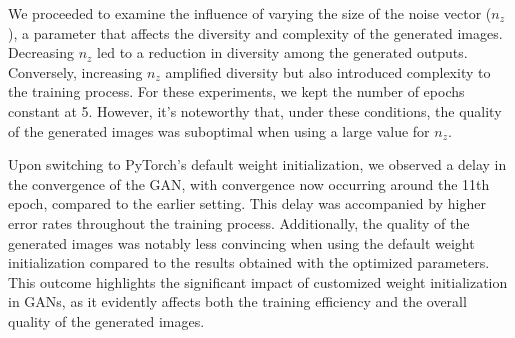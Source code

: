 We proceeded to examine the influence of varying the size of the noise vector ($n_z$), a parameter that affects the diversity and complexity of the generated images. Decreasing $n_z$ led to a reduction in diversity among the generated outputs. Conversely, increasing $n_z$ amplified diversity but also introduced complexity to the training process. For these experiments, we kept the number of epochs constant at 5. However, it's noteworthy that, under these conditions, the quality of the generated images was suboptimal when using a large value for $n_z$.

Upon switching to PyTorch's default weight initialization, we observed a delay in the convergence of the GAN, with convergence now occurring around the 11th epoch, compared to the earlier setting. This delay was accompanied by higher error rates throughout the training process. Additionally, the quality of the generated images was notably less convincing when using the default weight initialization compared to the results obtained with the optimized parameters. This outcome highlights the significant impact of customized weight initialization in GANs, as it evidently affects both the training efficiency and the overall quality of the generated images.





